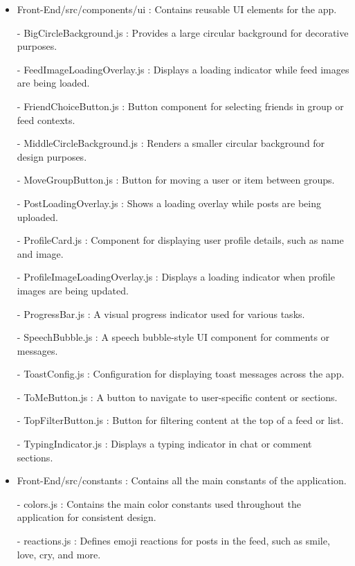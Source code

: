 \begin{itemize}
                    \item Front-End/src/components/ui : Contains reusable UI elements for the app.
                        \item[-] BigCircleBackground.js : Provides a large circular background for decorative purposes.
                        \item[-] FeedImageLoadingOverlay.js : Displays a loading indicator while feed images are being loaded.
                        \item[-] FriendChoiceButton.js : Button component for selecting friends in group or feed contexts.
                        \item[-] MiddleCircleBackground.js : Renders a smaller circular background for design purposes.
                        \item[-] MoveGroupButton.js : Button for moving a user or item between groups.
                        \item[-] PostLoadingOverlay.js : Shows a loading overlay while posts are being uploaded.
                        \item[-] ProfileCard.js : Component for displaying user profile details, such as name and image.
                        \item[-] ProfileImageLoadingOverlay.js : Displays a loading indicator when profile images are being updated.
                        \item[-] ProgressBar.js : A visual progress indicator used for various tasks.
                        \item[-] SpeechBubble.js : A speech bubble-style UI component for comments or messages.
                        \item[-] ToastConfig.js : Configuration for displaying toast messages across the app.
                        \item[-] ToMeButton.js : A button to navigate to user-specific content or sections.
                        \item[-] TopFilterButton.js : Button for filtering content at the top of a feed or list.
                        \item[-] TypingIndicator.js : Displays a typing indicator in chat or comment sections.
                    \vspace{3mm}

                    \item Front-End/src/constants : Contains all the main constants of the application.
                    \item[-] colors.js : Contains the main color constants used throughout the application for consistent design.
                    \item[-] reactions.js : Defines emoji reactions for posts in the feed, such as smile, love, cry, and more.
                \vspace{3mm}


\end{itemize}
